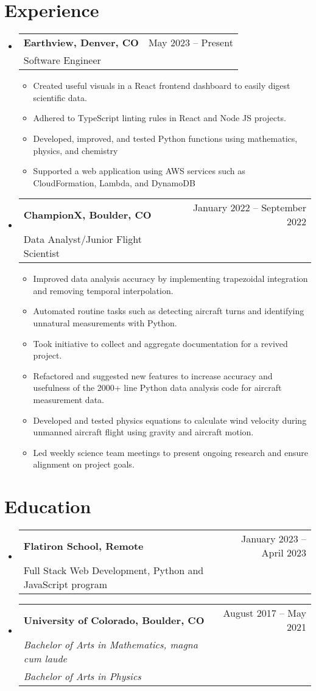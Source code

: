 \documentclass[a4paper,11pt]{article}
\makeatletter
\newcommand{\resumeItem}[1]{
  \item\small{#1}
}
\newcommand{\resumeItemListStart}{\begin{itemize}[rightmargin=0.11in]}
\newcommand{\resumeItemListEnd}{\end{itemize}}
\newcommand{\resumeQuadHeading}[4]{
  \item
  \begin{tabular*}{0.96\textwidth}[t]{l@{\extracolsep{\fill}}r}
    \textbf{#1} & #2 \\
    \small#3 & \small #4 \\
  \end{tabular*}
}
\newcommand{\resumeQuadHeadingPlusOne}[5]{
  \item
  \begin{tabular*}{0.96\textwidth}[t]{l@{\extracolsep{\fill}}r}
    \textbf{#1} & #2 \\
    \textit{\small#3} & \textit{\small #4} \\
    \textit{\small#5}
  \end{tabular*}
}
\newcommand{\resumeHeadingListStart}{
  \begin{itemize}[leftmargin=0.0in, label={}]
}
\newcommand{\resumeHeadingListEnd}{\end{itemize}}
\makeatother
\begin{document}
\section{Experience}
\resumeHeadingListStart{}

  \resumeQuadHeading{Earthview, Denver, CO}{May 2023 -- Present}
  {Software Engineer}{}
    \resumeItemListStart{}
      \resumeItem{Created useful visuals in a React frontend dashboard to easily digest scientific data.}
      \resumeItem{Adhered to TypeScript linting rules in React and Node JS projects.}
      \resumeItem{Developed, improved, and tested Python functions using mathematics, physics, and chemistry}
      \resumeItem{Supported a web application using AWS services such as CloudFormation, Lambda, and DynamoDB}
    \resumeItemListEnd{}

  \resumeQuadHeading{ChampionX, Boulder, CO}{January 2022 -- September 2022}
  {Data Analyst/Junior Flight Scientist}{}
    \resumeItemListStart{}
      \resumeItem{Improved data analysis accuracy by implementing trapezoidal integration and removing temporal interpolation.}
      \resumeItem{Automated routine tasks such as detecting aircraft turns and identifying unnatural measurements with Python.}
      \resumeItem{Took initiative to collect and aggregate documentation for a revived project.}
      \resumeItem{Refactored and suggested new features to increase accuracy and usefulness of the 2000+ line Python data analysis code for aircraft measurement data.}
      \resumeItem{Developed and tested physics equations to calculate wind velocity during unmanned aircraft flight using gravity and aircraft motion.}
      \resumeItem{Led weekly science team meetings to present ongoing research and ensure alignment on project goals.}
    \resumeItemListEnd{}

\resumeHeadingListEnd{}


\section{Education}
  \resumeHeadingListStart{}
    \resumeQuadHeading{Flatiron School, Remote}{January 2023 -- April 2023}
    {Full Stack Web Development, Python and JavaScript program}{}
    \resumeQuadHeadingPlusOne{University of Colorado, Boulder, CO}{August 2017 -- May 2021}
    {Bachelor of Arts in Mathematics, \textit{magna cum laude}}{}{Bachelor of Arts in Physics}
  \resumeHeadingListEnd{}
\end{document}
